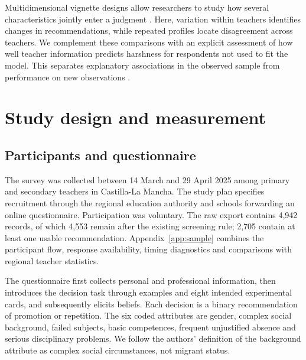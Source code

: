 Multidimensional vignette designs allow researchers to study how several characteristics jointly enter a judgment \cite{conjoint}. Here, variation within teachers identifies changes in recommendations, while repeated profiles locate disagreement across teachers. We complement these comparisons with an explicit assessment of how well teacher information predicts harshness for respondents not used to fit the model. This separates explanatory associations in the observed sample from performance on new observations \cite{prediction}.

\section{Study design and measurement}
\subsection{Participants and questionnaire}
The survey was collected between 14 March and 29 April 2025 among primary and secondary teachers in Castilla-La Mancha. The study plan specifies recruitment through the regional education authority and schools forwarding an online questionnaire. Participation was voluntary. The raw export contains 4,942 records, of which 4,553 remain after the existing screening rule; 2,705 contain at least one usable recommendation. Appendix~\ref{app:sample} combines the participant flow, response availability, timing diagnostics and comparisons with regional teacher statistics.

The questionnaire first collects personal and professional information, then introduces the decision task through examples and eight intended experimental cards, and subsequently elicits beliefs. Each decision is a binary recommendation of promotion or repetition. The six coded attributes are gender, complex social background, failed subjects, basic competences, frequent unjustified absence and serious disciplinary problems. We follow the authors' definition of the background attribute as complex social circumstances, not migrant status.

